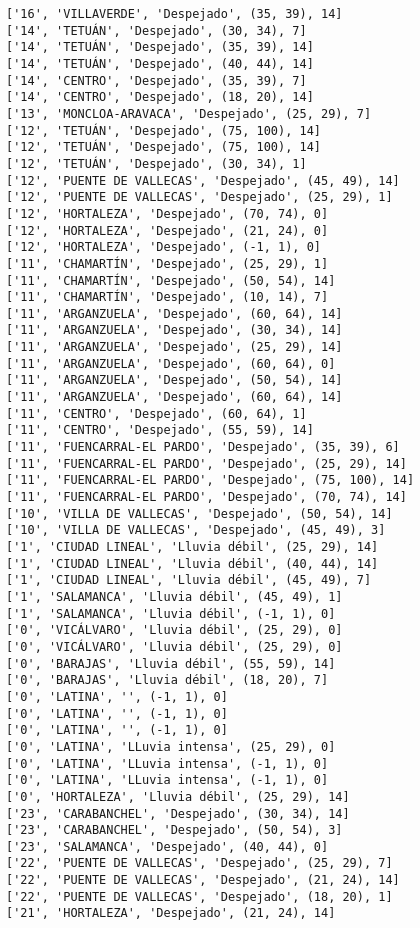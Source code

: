 \documentclass[11pt]{article}
\begin{document}
\begin{Verbatim}[commandchars=\\\{\}]
['16', 'VILLAVERDE', 'Despejado', (35, 39), 14]
['14', 'TETUÁN', 'Despejado', (30, 34), 7]
['14', 'TETUÁN', 'Despejado', (35, 39), 14]
['14', 'TETUÁN', 'Despejado', (40, 44), 14]
['14', 'CENTRO', 'Despejado', (35, 39), 7]
['14', 'CENTRO', 'Despejado', (18, 20), 14]
['13', 'MONCLOA-ARAVACA', 'Despejado', (25, 29), 7]
['12', 'TETUÁN', 'Despejado', (75, 100), 14]
['12', 'TETUÁN', 'Despejado', (75, 100), 14]
['12', 'TETUÁN', 'Despejado', (30, 34), 1]
['12', 'PUENTE DE VALLECAS', 'Despejado', (45, 49), 14]
['12', 'PUENTE DE VALLECAS', 'Despejado', (25, 29), 1]
['12', 'HORTALEZA', 'Despejado', (70, 74), 0]
['12', 'HORTALEZA', 'Despejado', (21, 24), 0]
['12', 'HORTALEZA', 'Despejado', (-1, 1), 0]
['11', 'CHAMARTÍN', 'Despejado', (25, 29), 1]
['11', 'CHAMARTÍN', 'Despejado', (50, 54), 14]
['11', 'CHAMARTÍN', 'Despejado', (10, 14), 7]
['11', 'ARGANZUELA', 'Despejado', (60, 64), 14]
['11', 'ARGANZUELA', 'Despejado', (30, 34), 14]
['11', 'ARGANZUELA', 'Despejado', (25, 29), 14]
['11', 'ARGANZUELA', 'Despejado', (60, 64), 0]
['11', 'ARGANZUELA', 'Despejado', (50, 54), 14]
['11', 'ARGANZUELA', 'Despejado', (60, 64), 14]
['11', 'CENTRO', 'Despejado', (60, 64), 1]
['11', 'CENTRO', 'Despejado', (55, 59), 14]
['11', 'FUENCARRAL-EL PARDO', 'Despejado', (35, 39), 6]
['11', 'FUENCARRAL-EL PARDO', 'Despejado', (25, 29), 14]
['11', 'FUENCARRAL-EL PARDO', 'Despejado', (75, 100), 14]
['11', 'FUENCARRAL-EL PARDO', 'Despejado', (70, 74), 14]
['10', 'VILLA DE VALLECAS', 'Despejado', (50, 54), 14]
['10', 'VILLA DE VALLECAS', 'Despejado', (45, 49), 3]
['1', 'CIUDAD LINEAL', 'Lluvia débil', (25, 29), 14]
['1', 'CIUDAD LINEAL', 'Lluvia débil', (40, 44), 14]
['1', 'CIUDAD LINEAL', 'Lluvia débil', (45, 49), 7]
['1', 'SALAMANCA', 'Lluvia débil', (45, 49), 1]
['1', 'SALAMANCA', 'Lluvia débil', (-1, 1), 0]
['0', 'VICÁLVARO', 'Lluvia débil', (25, 29), 0]
['0', 'VICÁLVARO', 'Lluvia débil', (25, 29), 0]
['0', 'BARAJAS', 'Lluvia débil', (55, 59), 14]
['0', 'BARAJAS', 'Lluvia débil', (18, 20), 7]
['0', 'LATINA', '', (-1, 1), 0]
['0', 'LATINA', '', (-1, 1), 0]
['0', 'LATINA', '', (-1, 1), 0]
['0', 'LATINA', 'LLuvia intensa', (25, 29), 0]
['0', 'LATINA', 'LLuvia intensa', (-1, 1), 0]
['0', 'LATINA', 'LLuvia intensa', (-1, 1), 0]
['0', 'HORTALEZA', 'Lluvia débil', (25, 29), 14]
['23', 'CARABANCHEL', 'Despejado', (30, 34), 14]
['23', 'CARABANCHEL', 'Despejado', (50, 54), 3]
['23', 'SALAMANCA', 'Despejado', (40, 44), 0]
['22', 'PUENTE DE VALLECAS', 'Despejado', (25, 29), 7]
['22', 'PUENTE DE VALLECAS', 'Despejado', (21, 24), 14]
['22', 'PUENTE DE VALLECAS', 'Despejado', (18, 20), 1]
['21', 'HORTALEZA', 'Despejado', (21, 24), 14]

\end{Verbatim}
\end{document}
